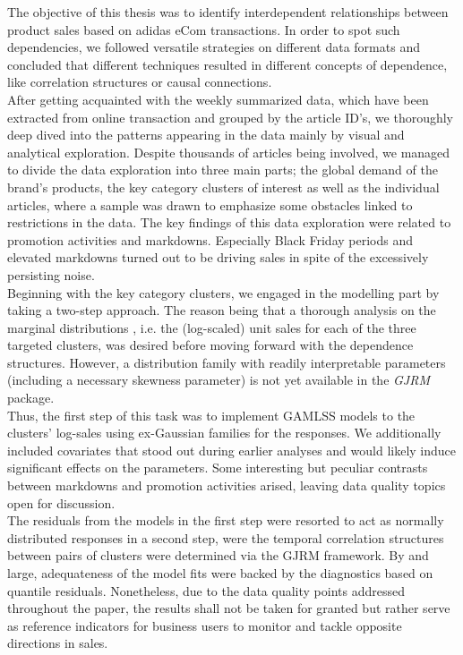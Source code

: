 
The objective of this thesis was to identify interdependent relationships between product sales based on adidas eCom transactions. In order to spot such dependencies, we followed versatile strategies on different data formats  and concluded that different techniques resulted in different concepts of dependence, like correlation structures or causal connections.
\\

After getting acquainted with the weekly summarized data, which have been extracted from online transaction and grouped by the article ID's, we thoroughly deep dived into the patterns appearing in the data mainly by visual and analytical exploration. Despite thousands of articles being involved, we managed to divide the data exploration into three main parts; the global demand of the brand's products, the key category clusters of interest as well as the individual articles, where a sample was drawn to emphasize some obstacles linked to restrictions in the data. The key findings of this data exploration were related to promotion activities and markdowns. Especially Black Friday periods and elevated markdowns turned out to be driving sales in spite of the excessively persisting noise.
\\

Beginning with the key category clusters, we engaged in the modelling part by taking a two-step approach. The reason being that a thorough analysis on the marginal distributions , i.e. the (log-scaled) unit sales for each of the three targeted clusters, was desired before moving forward with the dependence structures. However, a distribution family with readily interpretable parameters (including a necessary skewness parameter) is not yet available in the \textit{GJRM} package. \\
Thus, the first step of this task was to implement \ac{GAMLSS} models to the clusters' log-sales using ex-Gaussian families for the responses. We additionally included covariates that stood out during earlier analyses and would likely induce significant effects on the parameters. Some interesting but peculiar contrasts between markdowns and promotion activities arised, leaving data quality topics open for discussion.\\
The residuals from the models in the first step were resorted to act as normally distributed responses in a second step, were the temporal correlation structures between pairs of clusters were determined via the \ac{GJRM} framework. By and large, adequateness of the model fits were backed by the diagnostics based on quantile residuals. Nonetheless, due to the data quality points addressed throughout the paper, the results shall not be taken for granted but rather serve as reference indicators for business users to monitor and tackle opposite directions in sales.
\\

